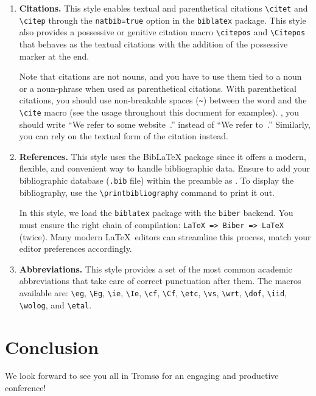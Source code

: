 \documentclass[fullpaper]{nldl}
\begin{document}
\begin{enumerate}[leftmargin=*]
\item \textbf{Citations.}
This style enables textual and parenthetical citations \verb|\citet| and \verb|\citep| through the \verb|natbib=true| option in the \verb|biblatex| package.
This style also provides a possessive or genitive citation macro \verb|\citepos| and \verb|\Citepos| that behaves as the textual citations with the addition of the possessive marker at the end.

Note that citations are not nouns, and you have to use them tied to a noun or a noun-phrase when used as parenthetical citations.
With parenthetical citations, you should use non-breakable spaces (\verb|~|) between the word and the \verb|\cite| macro (see the usage throughout this document for examples).
\Eg, you should write ``We refer to some website~\citep{tromso}.''  instead of ``We refer to~\citep{tromso}.''
Similarly, you can rely on the textual form of the citation instead.

\item \textbf{References.}
This style uses the BibLaTeX package since it offers a modern, flexible, and convenient way to handle bibliographic data.
Ensure to add your bibliographic database (\verb|.bib| file) within the preamble as \verb||.
To display the bibliography, use the \verb|\printbibliography| command to print it out.

In this style, we load the \verb|biblatex| package with the \verb|biber| backend.
You must ensure the right chain of compilation: \verb|LaTeX => Biber => LaTeX| (twice).
Many modern \LaTeX\ editors can streamline this process, match your editor preferences accordingly.

\item \textbf{Abbreviations.}
This style provides a set of the most common academic abbreviations that take care of correct punctuation after them.
The macros available are: \verb|\eg|, \verb|\Eg|, \verb|\ie|, \verb|\Ie|, \verb|\cf|, \verb|\Cf|, \verb|\etc|, \verb|\vs|, \verb|\wrt|, \verb|\dof|, \verb|\iid|, \verb|\wolog|, and \verb|\etal|.

\end{enumerate}

\section{Conclusion}
We look forward to see you all in Troms{\o} for an engaging and productive conference!


\printbibliography
\end{document}
